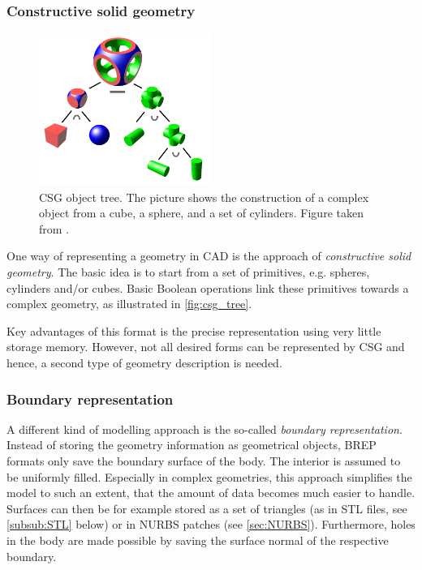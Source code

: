 \subsubsection{Constructive solid geometry}
\begin{figure}
\centering
\includegraphics[width=0.5\textwidth]{Pictures/Csg_tree.png}
\caption{CSG object tree. The picture shows the construction of a complex object from a cube, a sphere, and a set of cylinders. Figure taken from \cite{WikipediaCSG}.}
\label{fig:csg_tree}
\end{figure}
One way of representing a geometry in CAD is the approach of \emph{constructive solid geometry}. The basic idea is to start from a set of primitives, e.g. spheres, cylinders and/or cubes. Basic Boolean operations link these primitives towards a complex geometry, as illustrated in \autoref{fig:csg_tree}.

Key advantages of this format is the precise representation using very little storage memory. However, not all desired forms can be represented by CSG and hence, a second type of geometry description is needed. 
\subsubsection{Boundary representation}
A different kind of modelling approach is the so-called \emph{boundary representation}. Instead of storing the geometry information as geometrical objects, BREP formats only save the boundary surface of the body. The interior is assumed to be uniformly filled. Especially in complex geometries, this approach simplifies the model to such an extent, that the amount of data becomes much easier to handle. Surfaces can then be for example stored as a set of triangles (as in STL files, see \autoref{subsub:STL} below) or in NURBS patches (see \autoref{sec:NURBS}).
Furthermore, holes in the body are made possible by saving the surface normal of the respective boundary. 

